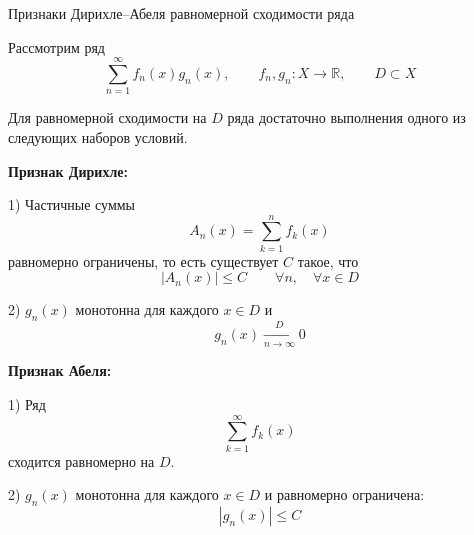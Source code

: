 \documentclass[12pt,a4paper]{article}
\begin{document}
\begin{theorem}{Признаки Дирихле--Абеля равномерной сходимости ряда}

    Рассмотрим ряд
    \[
        \sum_{n=1}^{\infty}f_n(x)g_n(x),
        \qquad
        f_n,g_n\colon X\to\mathbb{R},
        \qquad
        D\subset X
    \]

    Для равномерной сходимости на $D$ ряда достаточно выполнения одного из следующих наборов условий.

    \textbf{Признак Дирихле:}

    1) Частичные суммы
    \[
        A_n(x)=\sum_{k=1}^{n}f_k(x)
    \]
    равномерно ограничены, то есть существует $C$ такое, что
    \[
        |A_n(x)|\leq C
        \qquad
        \forall n,\quad\forall x\in D
    \]

    2) $g_n(x)$ монотонна для каждого $x\in D$ и
    \[
        g_n(x)\xrightarrow[n\to\infty]{D}0
    \]

    \textbf{Признак Абеля:}

    1) Ряд
    \[
        \sum_{k=1}^{\infty}f_k(x)
    \]
    сходится равномерно на $D$.

    2) $g_n(x)$ монотонна для каждого $x\in D$ и равномерно ограничена:
    \[
        |g_n(x)|\leq C
    \]

\end{theorem}
\end{document}
